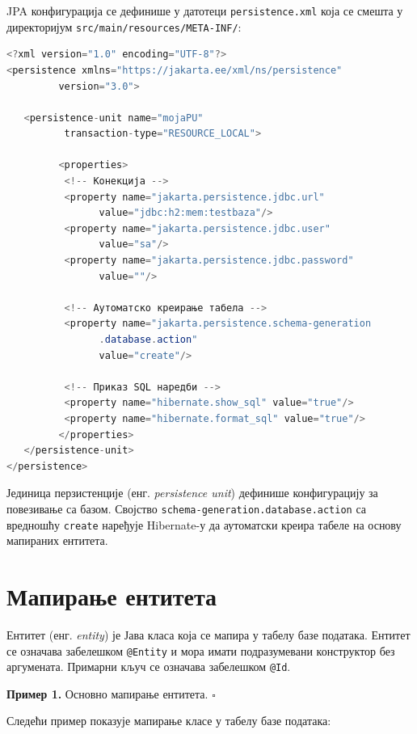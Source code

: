 JPA конфигурација се дефинише у датотеци \texttt{persistence.xml} која се смешта у директоријум \texttt{src/main/resources/META-INF/}:


\begin{lstlisting}[language=Java]
<?xml version="1.0" encoding="UTF-8"?>
<persistence xmlns="https://jakarta.ee/xml/ns/persistence"
         version="3.0">
 
   <persistence-unit name="mojaPU"
          transaction-type="RESOURCE_LOCAL">
 
         <properties>
          <!-- Конекција -->
          <property name="jakarta.persistence.jdbc.url"
                value="jdbc:h2:mem:testbaza"/>
          <property name="jakarta.persistence.jdbc.user"
                value="sa"/>
          <property name="jakarta.persistence.jdbc.password"
                value=""/>
 
          <!-- Аутоматско креирање табела -->
          <property name="jakarta.persistence.schema-generation
                .database.action"
                value="create"/>
 
          <!-- Приказ SQL наредби -->
          <property name="hibernate.show_sql" value="true"/>
          <property name="hibernate.format_sql" value="true"/>
         </properties>
   </persistence-unit>
</persistence>
\end{lstlisting}


Јединица перзистенције (енг. \textit{persistence unit}) дефинише конфигурацију за повезивање са базом. Својство \texttt{schema-generation.database.action} са вредношћу \texttt{create} наређује Hibernate-у да аутоматски креира табеле на основу мапираних ентитета.


\section{Мапирање ентитета}

Ентитет (енг. \textit{entity}) је Јава класа која се мапира у табелу базе података. Ентитет се означава забелешком \texttt{@Entity} и мора имати подразумевани конструктор без аргумената. Примарни кључ се означава забелешком \texttt{@Id}.


\bigskip

\noindent \textbf{Пример 1.} Основно мапирање ентитета. $\square$

\medskip

Следећи пример показује мапирање класе у табелу базе података:


